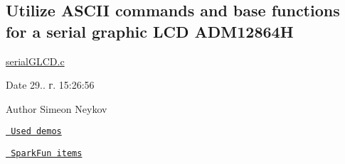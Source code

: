 \subsection*{Utilize A\+S\+C\+II commands and base functions for a serial graphic L\+CD A\+D\+M12864H}

\mbox{\hyperlink{serial_g_l_c_d_8c}{serial\+G\+L\+C\+D.\+c}}

\begin{DoxyDate}{Date}
29.. г. 15\+:26\+:56 
\end{DoxyDate}
\begin{DoxyAuthor}{Author}
Simeon Neykov
\end{DoxyAuthor}
\href{https://www.avrfreaks.net/forum/tut-c-bit-manipulation-aka-programming-101?name=PNphpBB2&file=viewtopic&t=37871}{\texttt{ Used demos}}

\href{https://learn.sparkfun.com/tutorials/serial-graphic-lcd-hookup/?_ga=1.12355956.1126191215.1366741676}{\texttt{ Spark\+Fun items}} 